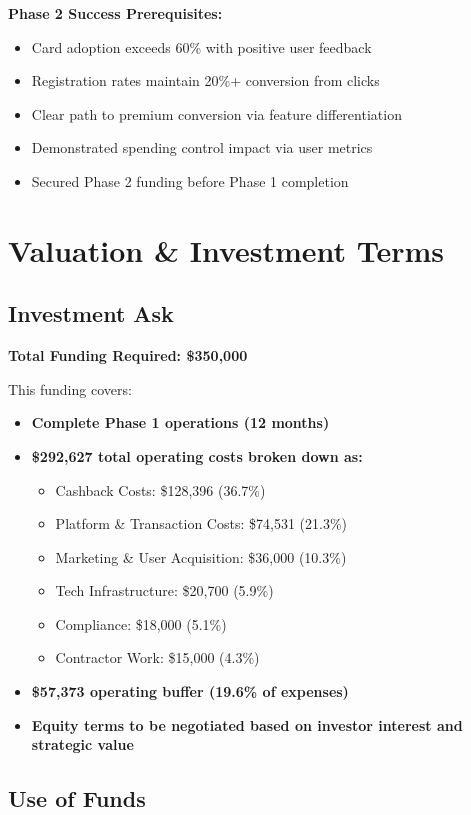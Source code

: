 \documentclass[11pt,letterpaper]{article}
\begin{document}
\textbf{Phase 2 Success Prerequisites:}
\begin{itemize}
\item Card adoption exceeds 60\% with positive user feedback
\item Registration rates maintain 20\%+ conversion from clicks
\item Clear path to premium conversion via feature differentiation
\item Demonstrated spending control impact via user metrics
\item Secured Phase 2 funding before Phase 1 completion
\end{itemize}

\newpage

\section{Valuation \& Investment Terms}

\subsection{Investment Ask}

\textbf{Total Funding Required: \$350,000}

This funding covers:
\begin{itemize}
\item \textbf{Complete Phase 1 operations (12 months)}
\item \textbf{\$292,627 total operating costs broken down as:}
\begin{itemize}
\item Cashback Costs: \$128,396 (36.7\%)
\item Platform \& Transaction Costs: \$74,531 (21.3\%)
\item Marketing \& User Acquisition: \$36,000 (10.3\%)
\item Tech Infrastructure: \$20,700 (5.9\%)
\item Compliance: \$18,000 (5.1\%)
\item Contractor Work: \$15,000 (4.3\%)
\end{itemize}
\item \textbf{\$57,373 operating buffer (19.6\% of expenses)}
\item \textbf{Equity terms to be negotiated based on investor interest and strategic value}
\end{itemize}

\subsection{Use of Funds}
\end{document}
